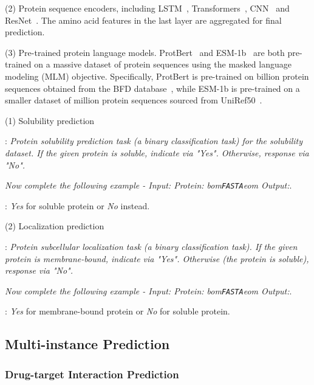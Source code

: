 \documentclass[11pt]{article}
\newcommand{\bop}{bom}
\newcommand{\eop}{eom}
\newcommand{\fasta}{\texttt{FASTA}}
\begin{document}
\noindent(2) Protein sequence encoders, including LSTM~\citep{hochreiter1997long}, Transformers~\citep{vaswani2017attention}, CNN~\citep{o2015introduction} and ResNet~\citep{he2016deep}.
The amino acid features in the last layer are aggregated for final prediction.

\noindent(3) Pre-trained protein language models.
ProtBert~\citep{elnaggar2021prottrans} and ESM-1b~\citep{rives2021biological} are both pre-trained on a massive dataset of protein sequences using the masked language modeling (MLM) objective. 
Specifically, ProtBert is pre-trained on  billion protein sequences obtained from the BFD database~\citep{steinegger2018clustering}, while ESM-1b is pre-trained on a smaller dataset of  million protein sequences sourced from UniRef50~\citep{suzek2007uniref}.


\noindent(1) Solubility prediction

:
\textit{Protein solubility prediction task (a binary classification task) for the solubility dataset. If the given protein is soluble, indicate via "Yes". Otherwise, response via "No".}

\textit{Now complete the following example - Input: Protein: \bop{}\fasta{}\eop{} Output:}.

:
\textit{Yes} for soluble protein or \textit{No} instead.

\noindent(2) Localization prediction

:
\textit{Protein subcellular localization task (a binary classification task). If the given protein is membrane-bound, indicate via "Yes". Otherwise (the protein is soluble), response via "No".}

\textit{Now complete the following example - Input: Protein: \bop{}\fasta{}\eop{} Output:}.

:
\textit{Yes} for membrane-bound protein or \textit{No} for soluble protein.

\subsection{Multi-instance Prediction}
\subsubsection{Drug-target Interaction Prediction}
\end{document}
